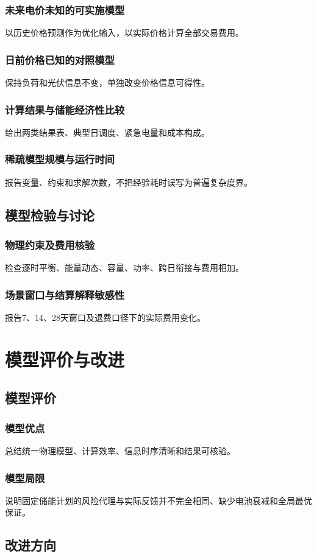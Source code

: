 \documentclass[UTF8,a4paper,zihao=-4]{ctexart}
\begin{document}
\subsubsection{未来电价未知的可实施模型}以历史价格预测作为优化输入，以实际价格计算全部交易费用。
\subsubsection{日前价格已知的对照模型}保持负荷和光伏信息不变，单独改变价格信息可得性。
\subsubsection{计算结果与储能经济性比较}给出两类结果表、典型日调度、紧急电量和成本构成。
\subsubsection{稀疏模型规模与运行时间}报告变量、约束和求解次数，不把经验耗时误写为普遍复杂度界。
\subsection{模型检验与讨论}
\subsubsection{物理约束及费用核验}检查逐时平衡、能量动态、容量、功率、跨日衔接与费用相加。
\subsubsection{场景窗口与结算解释敏感性}报告7、14、28天窗口及退费口径下的实际费用变化。
\section{模型评价与改进}
\subsection{模型评价}
\subsubsection{模型优点}总结统一物理模型、计算效率、信息时序清晰和结果可核验。
\subsubsection{模型局限}说明固定储能计划的风险代理与实际反馈并不完全相同、缺少电池衰减和全局最优保证。
\subsection{改进方向}
\end{document}
